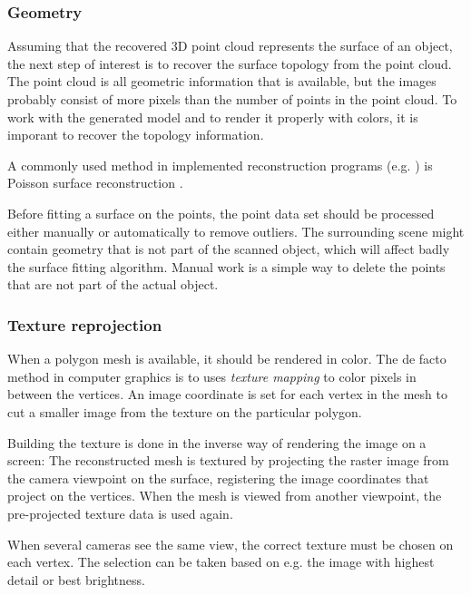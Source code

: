 
\subsubsection{Geometry} %

Assuming that the recovered 3D point cloud represents the surface of an object, the next step of interest is to recover the surface topology from the point cloud.
The point cloud is all geometric information that is available, but the images probably consist of more pixels than the number of points in the point cloud.
To work with the generated model and to render it properly with colors, it is imporant to recover the topology information.

A commonly used method in implemented reconstruction programs (e.g. \cite{meshlab}) is Poisson surface reconstruction \cite{kazhdan2013screened}.

Before fitting a surface on the points, the point data set should be processed either manually or automatically to remove outliers.
The surrounding scene might contain geometry that is not part of the scanned object, which will affect badly the surface fitting algorithm.
Manual work is a simple way to delete the points that are not part of the actual object.


\subsubsection{Texture reprojection} %

When a polygon mesh is available, it should be rendered in color.
The de facto method in computer graphics is to uses \textit{texture mapping} to color pixels in between the vertices.
An image coordinate is set for each vertex in the mesh to cut a smaller image from the texture on the particular polygon.

Building the texture is done in the inverse way of rendering the image on a screen:
The reconstructed mesh is textured by projecting the raster image from the camera viewpoint on the surface, registering the image coordinates that project on the vertices.
When the mesh is viewed from another viewpoint, the pre-projected texture data is used again.

When several cameras see the same view, the correct texture must be chosen on each vertex.
The selection can be taken based on e.g. the image with highest detail or best brightness.

